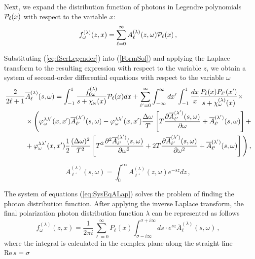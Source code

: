 \documentclass[
aps,%
12pt,%
final,%
notitlepage,%
oneside,%
onecolumn,%
nobibnotes,%
nofootinbib,%
superscriptaddress,%
noshowpacs,%
centertags]%
{revtex4}
\begin{document}
	Next, we expand the distribution function of photons in Legendre polynomials ${\cal P}_\ell(x)$ with respect to the variable $x$:
\begin{equation}\label{eq:fSerLegender}
f_\omega^{(\lambda)}(z, x) = \sum_{\ell = 0}^{\infty} A_\ell^{(\lambda)}(z,\omega) {\cal P}_\ell(x)\, ,
\end{equation}

Substituting (\ref{eq:fSerLegender}) into (\ref{FormSol}) and applying the Laplace transform to the resulting expression with respect to the variable $z$, we obtain a system of second-order differential equations with respect to the variable $\omega$
\begin{equation}\label{eq:SysEqALap}
\begin{aligned}
\frac{2}{2 \ell +1} &\overline{A}_\ell^{(\lambda)}(s,\omega) = \int_{-1}^{1} \frac{f_{0\omega}^{(\lambda)}}{s+{\cal \chi}_\omega(x)}{\cal P}_\ell(x)dx+ \sum_{\ell'=0}^{\infty}\int_{-\infty}^{\infty}dx'\int_{-1}^{1}\frac{dx}{x} \frac{P_\ell(x) P_{\ell'}(x')}{s+{\cal \chi}_\omega^{(\lambda)}(x)}\times
\\
&\times\Bigg( \varphi_\omega^{\lambda\lambda'}(x,x')\overline{A}_{\ell'}^{(\lambda')}(s,\omega)
- \varphi_\omega^{\lambda\lambda'}(x,x')\frac{\Delta \omega}{T}
\left[
T \frac{\partial \overline{A}_{\ell'}^{(\lambda')}(s,\omega)}{\partial \omega} + \overline{A}_{\ell'}^{(\lambda')}(s,\omega)
\right]+
\\
&+ \varphi_\omega^{\lambda\lambda'}(x,x')\frac{1}{2}\frac{(\Delta \omega)^2}{T^2}
\left[
T^2 \frac{\partial^2 \overline{A}_{\ell'}^{(\lambda')}(s,\omega)}{\partial \omega^2} + 2T \frac{\partial \overline{A}_{\ell'}^{(\lambda')}(s,\omega)}{\partial \omega^2}+\overline{A}_{\ell'}^{(\lambda')}(s,\omega)
\right]\Bigg)\, ,
\end{aligned}
\end{equation}

\begin{equation}\label{lapA}
\overline{A}_{\ell'}^{(\lambda)}(s,\omega)=\int_{0}^{\infty} A^{(\lambda)}_{\ell'}(z,\omega) e^{-sz}dz\, ,
\end{equation}

The system of equations (\ref{eq:SysEqALap}) solves the problem of finding the photon distribution function. After applying the inverse Laplace transform, the final polarization photon distribution function $\lambda$ can be represented as follows
\begin{equation}
f_\omega^{(\lambda)}(z, x) = \frac{1}{2\pi i}\sum_{\ell=0}^{\infty} 
P_\ell(x)\int_{\sigma-i\infty}^{\sigma + i \infty}ds \cdot e^{sz} \overline{A}^{(\lambda)}_\ell(s,\omega)\, ,
\end{equation}
where the integral is calculated in the complex plane along the straight line $\text{Re} \, s = \sigma$
\end{document}
